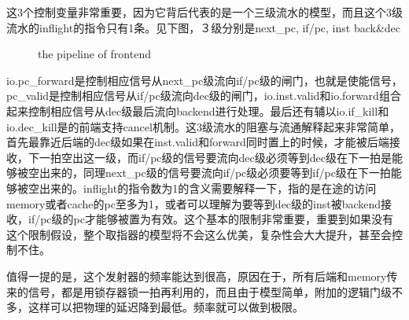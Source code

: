 \documentclass[11pt]{article}
\begin{document}
这3个控制变量非常重要，因为它背后代表的是一个三级流水的模型，而且这个3级流水的inflight的指令只有1条。见下图，３级分别是next\_pc, if/pc, inst back\&dec
\begin{figure}[H]
	\centering
	\caption{the pipeline of frontend}	
\end{figure}
io.pc\_forward是控制相应信号从next\_pc级流向if/pc级的闸门，也就是使能信号，pc\_valid是控制相应信号从if/pc级流向dec级的闸门，io.inst.valid和io.forward组合起来控制相应信号从dec级最后流向backend进行处理。最后还有辅以io.if\_kill和io.dec\_kill是的前端支持cancel机制。这3级流水的阻塞与流通解释起来非常简单，首先最靠近后端的dec级如果在inst.valid和forward同时置上的时候，才能被后端接收，下一拍空出这一级，而if/pc级的信号要流向dec级必须等到dec级在下一拍是能够被空出来的，同理next\_pc级的信号要流向if/pc级必须要等到if/pc级在下一拍能够被空出来的。inflight的指令数为1的含义需要解释一下，指的是在途的访问memory或者cache的pc至多为1，或者可以理解为要等到dec级的inst被backend接收，if/pc级的pc才能够被置为有效。这个基本的限制非常重要，重要到如果没有这个限制假设，整个取指器的模型将不会这么优美，复杂性会大大提升，甚至会控制不住。

值得一提的是，这个发射器的频率能达到很高，原因在于，所有后端和memory传来的信号，都是用锁存器锁一拍再利用的，而且由于模型简单，附加的逻辑门级不多，这样可以把物理的延迟降到最低。频率就可以做到极限。
\end{document}
